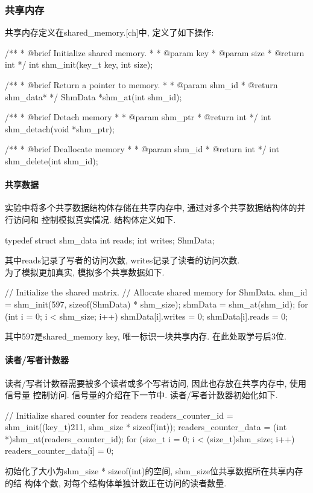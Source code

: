 \subsubsection{共享内存}
共享内存定义在shared\_memory.[ch]中, 定义了如下操作:
\begin{code}
    /**
    * @brief Initialize shared memory.
    *
    * @param key
    * @param size
    * @return int
    */
    int shm_init(key_t key, int size);

    /**
    * @brief Return a pointer to memory.
    *
    * @param shm_id
    * @return shm_data*
    */
    ShmData *shm_at(int shm_id);

    /**
    * @brief Detach memory
    *
    * @param shm_ptr
    * @return int
    */
    int shm_detach(void *shm_ptr);

    /**
    * @brief Deallocate memory
    *
    * @param shm_id
    * @return int
    */
    int shm_delete(int shm_id);
\end{code}

\paragraph{共享数据}
实验中将多个共享数据结构体存储在共享内存中, 通过对多个共享数据结构体的并行访问和
控制模拟真实情况. 结构体定义如下.

\begin{code}
    typedef struct shm_data {
    int reads;
    int writes;
    } ShmData;
\end{code}

其中reads记录了写者的访问次数, writes记录了读者的访问次数.\\
为了模拟更加真实, 模拟多个共享数据如下.
\begin{code}
    // Initialize the shared matrix.
    // Allocate shared memory for ShmData.
    shm_id = shm_init(597, sizeof(ShmData) * shm_size);
    shmData = shm_at(shm_id);
    for (int i = 0; i < shm_size; i++) {
            shmData[i].writes = 0;
            shmData[i].reads = 0;
        }

\end{code}
其中597是shared\_memory key, 唯一标识一块共享内存. 在此处取学号后3位.

\paragraph{读者/写者计数器}
读者/写者计数器需要被多个读者或多个写者访问, 因此也存放在共享内存中, 使用信号量
控制访问. 信号量的介绍在下一节中. 读者/写者计数器初始化如下.
\begin{code}[caption={读者计数器}]
    // Initialize shared counter for readers
    readers_counter_id = shm_init((key_t)211, shm_size * sizeof(int));
    readers_counter_data = (int *)shm_at(readers_counter_id);
    for (size_t i = 0; i < (size_t)shm_size; i++) {
    readers_counter_data[i] = 0;
    }
\end{code}
初始化了大小为shm\_size * sizeof(int)的空间, shm\_size位共享数据所在共享内存的结
构体个数, 对每个结构体单独计数正在访问的读者数量.

